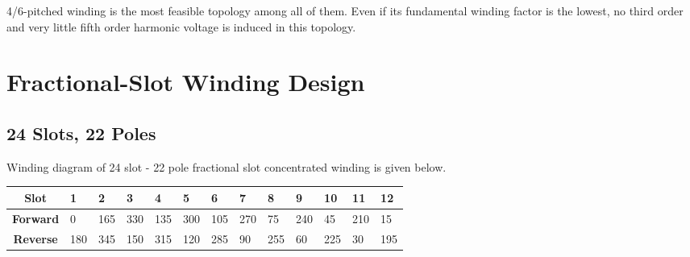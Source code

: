 \documentclass{reportClass}
\begin{document}
4/6-pitched winding is the most feasible topology among all of them. Even if its fundamental winding factor is the lowest, no third order and very little fifth order harmonic voltage is induced in this topology.

\section{Fractional-Slot Winding Design}

\subsection{24 Slots, 22 Poles}

Winding diagram of 24 slot - 22 pole fractional slot concentrated winding is given below.

\begin{table}[h!]
\centering
\begin{tabular}{|cllllllllllll|}
\hline
\multicolumn{1}{|c|}{\textbf{Slot}}    & \multicolumn{1}{l|}{\textbf{1}}                          & \multicolumn{1}{l|}{\textbf{2}}                          & \multicolumn{1}{l|}{\textbf{3}}                          & \multicolumn{1}{l|}{\textbf{4}}                          & \multicolumn{1}{l|}{\textbf{5}}                          & \multicolumn{1}{l|}{\textbf{6}}                          & \multicolumn{1}{l|}{\textbf{7}}                          & \multicolumn{1}{l|}{\textbf{8}}                          & \multicolumn{1}{l|}{\textbf{9}}                          & \multicolumn{1}{l|}{\textbf{10}}                         & \multicolumn{1}{l|}{\textbf{11}}                         & \textbf{12}                         \\ \hline
\multicolumn{1}{|c|}{\textbf{Forward}} & \multicolumn{1}{l|}{0}                                   & \multicolumn{1}{l|}{165}                                 & \multicolumn{1}{l|}{330}                                 & \multicolumn{1}{l|}{135}                                 & \multicolumn{1}{l|}{300}                                 & \multicolumn{1}{l|}{105}                                 & \multicolumn{1}{l|}{270}                                 & \multicolumn{1}{l|}{75}                                  & \multicolumn{1}{l|}{240}                                 & \multicolumn{1}{l|}{45}                                  & \multicolumn{1}{l|}{210}                                 & 15                                  \\ \hline
\multicolumn{1}{|c|}{\textbf{Reverse}} & \multicolumn{1}{l|}{180}                                 & \multicolumn{1}{l|}{345}                                 & \multicolumn{1}{l|}{150}                                 & \multicolumn{1}{l|}{315}                                 & \multicolumn{1}{l|}{120}                                 & \multicolumn{1}{l|}{285}                                 & \multicolumn{1}{l|}{90}                                  & \multicolumn{1}{l|}{255}                                 & \multicolumn{1}{l|}{60}                                  & \multicolumn{1}{l|}{225}                                 & \multicolumn{1}{l|}{30}                                  & 195                                 \\ \hline

\end{tabular}
\end{table}
\end{document}
